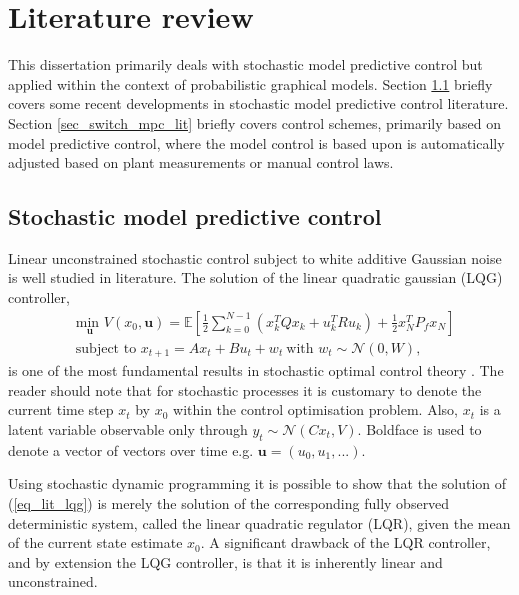 \chapter{Literature review}
\label{sec_lit_study}
This dissertation primarily deals with stochastic model predictive control but applied within the context of probabilistic graphical models. Section \ref{sec_stoch_mpc_lit} briefly covers some recent developments in stochastic model predictive control literature. Section \ref{sec_switch_mpc_lit} briefly covers control schemes, primarily  based on model predictive control, where the model control is based upon is automatically adjusted based on plant measurements or manual control laws.

\section{Stochastic model predictive control}
\label{sec_stoch_mpc_lit}
Linear unconstrained stochastic control subject to white additive Gaussian noise is well studied in literature. The solution of the linear quadratic gaussian (LQG) controller,
\begin{equation}
\begin{aligned}
&\underset{\mathbf{u}}{\text{min }} V(x_0, \mathbf{u}) = \mathbb{E}\left[ \frac{1}{2}\sum_{k=0}^{N-1} \left( x_k^TQx_k + u_k^TRu_k \right) + \frac{1}{2}x_N^TP_fx_N \right] \\
& \text{subject to } x_{t+1}=Ax_t+Bu_t + w_t~\text{with } w_t \sim \mathcal{N}(0, W),
\end{aligned}
\label{eq_lit_lqg}
\end{equation}
is one of the most fundamental results in stochastic optimal control theory \cite{lqg}. The reader should note that for stochastic processes it is customary to denote the current time step $x_t$ by $x_0$ within the control optimisation problem. Also, $x_t$ is a latent variable observable only through $y_t \sim \mathcal{N}(Cx_t, V)$. Boldface is used to denote a vector of vectors over time e.g. $\mathbf{u}=(u_0, u_1,...)$.

Using stochastic dynamic programming it is possible to show that the solution of (\ref{eq_lit_lqg}) is merely the solution of the corresponding fully observed deterministic system, called the linear quadratic regulator (LQR), given the mean of the current state estimate $x_0$. A significant drawback of the LQR controller, and by extension the LQG controller, is that it is inherently linear and unconstrained.

